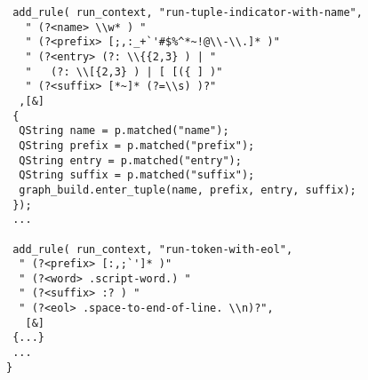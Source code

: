 \begin{lstlisting}
 add_rule( run_context, "run-tuple-indicator-with-name",
   " (?<name> \\w* ) "
   " (?<prefix> [;,:_+`'#$%^*~!@\\-\\.]* )"
   " (?<entry> (?: \\{{2,3} ) | "
   "   (?: \\[{2,3} ) | [ [({ ] )"
   " (?<suffix> [*~]* (?=\\s) )?"
  ,[&]
 {
  QString name = p.matched("name");
  QString prefix = p.matched("prefix");
  QString entry = p.matched("entry");
  QString suffix = p.matched("suffix");
  graph_build.enter_tuple(name, prefix, entry, suffix);
 });
 ...
 
 add_rule( run_context, "run-token-with-eol",
  " (?<prefix> [:,;`']* )"
  " (?<word> .script-word.) "
  " (?<suffix> :? ) "
  " (?<eol> .space-to-end-of-line. \\n)?",
   [&]
 {...}
 ...
}
\end{lstlisting}


